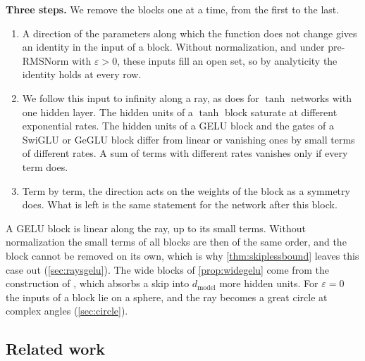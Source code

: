 \documentclass[10pt]{article}
\theoremstyle{definition}
\theoremstyle{remark}
\newcommand{\dm}{d_{\mathrm{model}}}
\newcommand{\para}[1]{\smallskip\noindent\textbf{#1}\hspace{0.5em}}
\begin{document}
\para{Three steps.} We remove the blocks one at a time, from the first to the last.
\begin{enumerate}[leftmargin=1.8em]
\item A direction of the parameters along which the function does not change gives an identity in the input of a block. Without normalization, and under pre-RMSNorm with $\varepsilon > 0$, these inputs fill an open set, so by analyticity the identity holds at every row.
\item We follow this input to infinity along a ray, as \citet{sussmann1992} does for $\tanh$ networks with one hidden layer. The hidden units of a $\tanh$ block saturate at different exponential rates. The hidden units of a GELU block and the gates of a SwiGLU or GeGLU block differ from linear or vanishing ones by small terms of different rates. A sum of terms with different rates vanishes only if every term does.
\item Term by term, the direction acts on the weights of the block as a symmetry does. What is left is the same statement for the network after this block.
\end{enumerate}
A GELU block is linear along the ray, up to its small terms. Without normalization the small terms of all blocks are then of the same order, and the block cannot be removed on its own, which is why \cref{thm:skiplessbound} leaves this case out (\cref{sec:raysgelu}). The wide blocks of \cref{prop:widegelu} come from the construction of \citet{mijoski2026worth}, which absorbs a skip into $\dm$ more hidden units. For $\varepsilon = 0$ the inputs of a block lie on a sphere, and the ray becomes a great circle at complex angles (\cref{sec:circle}).

\subsection{Related work}\label{sec:related}
\end{document}
